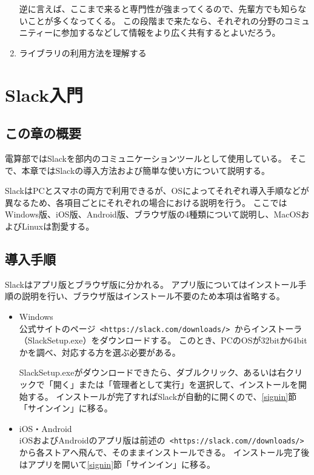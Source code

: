 \documentclass[lualatex,ja=standard,12pt,a4j]{bxjsbook}
\begin{document}
\begin{enumerate}
                逆に言えば、ここまで来ると専門性が強まってくるので、先輩方でも知らないことが多くなってくる。
                この段階まで来たなら、それぞれの分野のコミュニティーに参加するなどして情報をより広く共有するとよいだろう。
				
				\item ライブラリの利用方法を理解する\\
                
			\end{enumerate}
	\chapter{Slack入門}
		\section{この章の概要}
			電算部ではSlackを部内のコミュニケーションツールとして使用している。
            そこで、本章ではSlackの導入方法および簡単な使い方について説明する。
            
            SlackはPCとスマホの両方で利用できるが、OSによってそれぞれ導入手順などが異なるため、各項目ごとにそれぞれの場合における説明を行う。
            ここではWindows版、iOS版、Android版、ブラウザ版の4種類について説明し、MacOSおよびLinuxは割愛する。
            
        \section{導入手順}
        	Slackはアプリ版とブラウザ版に分かれる。
            アプリ版についてはインストール手順の説明を行い、ブラウザ版はインストール不要のため本項は省略する。
        	\begin{itemize} 
            	\item Windows\\
                	公式サイトのページ\verb| <https://slack.com/downloads/> |からインストーラ（SlackSetup.exe）をダウンロードする。
                    このとき、PCのOSが32bitか64bitかを調べ、対応する方を選ぶ必要がある。
                    
                    SlackSetup.exeがダウンロードできたら、ダブルクリック、あるいは右クリックで「開く」または「管理者として実行」を選択して、インストールを開始する。
                	インストールが完了すればSlackが自動的に開くので、\ref{signin}節「サインイン」に移る。
                    
              	\item iOS・Android\\
                	iOSおよびAndroidのアプリ版は前述の\verb| <https://slack.com//downloads/> |から各ストアへ飛んで、そのままインストールできる。
                    インストール完了後はアプリを開いて\ref{signin}節「サインイン」に移る。
                    
            \end{itemize}
\end{document}
